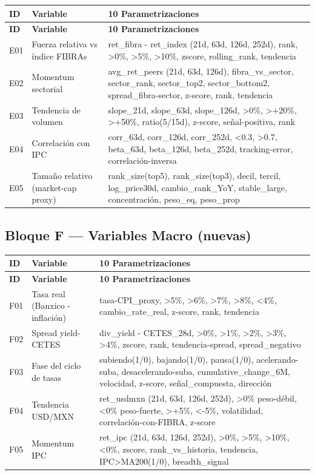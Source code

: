 \documentclass[12pt,letterpaper]{article}
\begin{document}
\begin{longtable}{p{0.8cm} p{4.5cm} p{9cm}}
\toprule
\textbf{ID} & \textbf{Variable} & \textbf{10 Parametrizaciones} \\
\midrule
\endfirsthead
\toprule \textbf{ID} & \textbf{Variable} & \textbf{10 Parametrizaciones} \\ \midrule
\endhead \bottomrule \endfoot
E01 & Fuerza relativa vs índice FIBRAs & ret\_fibra - ret\_index (21d, 63d, 126d, 252d), rank, >0\%, >5\%, >10\%, zscore, rolling\_rank, tendencia \\[3pt]
E02 & Momentum sectorial & avg\_ret\_peers (21d, 63d, 126d), fibra\_vs\_sector, sector\_rank, sector\_top2, sector\_bottom2, spread\_fibra-sector, z-score, rank, tendencia \\[3pt]
E03 & Tendencia de volumen & slope\_21d, slope\_63d, slope\_126d, >0\%, >+20\%, >+50\%, ratio(5/15d), z-score, señal-positiva, rank \\[3pt]
E04 & Correlación con IPC & corr\_63d, corr\_126d, corr\_252d, <0.3, >0.7, beta\_63d, beta\_126d, beta\_252d, tracking-error, correlación-inversa \\[3pt]
E05 & Tamaño relativo (market-cap proxy) & rank\_size(top5), rank\_size(top3), decil, tercil, log\_price30d, cambio\_rank\_YoY, stable\_large, concentración, peso\_eq, peso\_prop \\
\end{longtable}

\subsection{Bloque F — Variables Macro (nuevas)}

\begin{longtable}{p{0.8cm} p{4.5cm} p{9cm}}
\toprule
\textbf{ID} & \textbf{Variable} & \textbf{10 Parametrizaciones} \\
\midrule
\endfirsthead
\toprule \textbf{ID} & \textbf{Variable} & \textbf{10 Parametrizaciones} \\ \midrule
\endhead \bottomrule \endfoot
F01 & Tasa real (Banxico - inflación) & tasa-CPI\_proxy, >5\%, >6\%, >7\%, >8\%, <4\%, cambio\_rate\_real, z-score, rank, tendencia \\[3pt]
F02 & Spread yield-CETES & div\_yield - CETES\_28d, >0\%, >1\%, >2\%, >3\%, >4\%, zscore, rank, tendencia-spread, spread\_negativo \\[3pt]
F03 & Fase del ciclo de tasas & subiendo(1/0), bajando(1/0), pausa(1/0), acelerando-suba, desacelerando-suba, cumulative\_change\_6M, velocidad, z-score, señal\_compuesta, dirección \\[3pt]
F04 & Tendencia USD/MXN & ret\_usdmxn (21d, 63d, 126d, 252d), >0\% peso-débil, <0\% peso-fuerte, >+5\%, <-5\%, volatilidad, correlación-con-FIBRA, z-score \\[3pt]
F05 & Momentum IPC & ret\_ipc (21d, 63d, 126d, 252d), >0\%, >5\%, >10\%, <0\%, zscore, rank\_vs\_historia, tendencia, IPC>MA200(1/0), breadth\_signal \\
\end{longtable}
\end{document}
